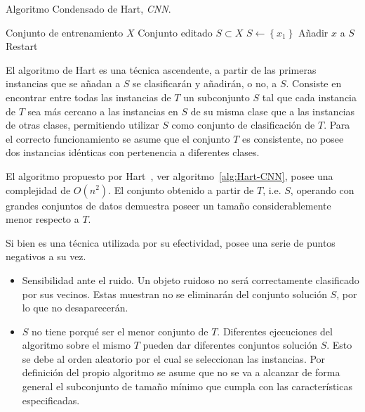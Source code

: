 \begin{algorithm}[H]
\caption{Algoritmo Condensado de Hart, \textit{CNN}.}\label{alg:Hart-CNN}
\begin{algorithmic}[1]
\Require Conjunto de entrenamiento $X$
\Ensure Conjunto editado $S \subset X$
\Statex
{}
	\State $S \leftarrow \left\lbrace x_1 \right\rbrace$
			\State Añadir $x$ a $S$
			\State Restart		
		\EndIf
	\EndFor
\EndProcedure
\end{algorithmic}
\end{algorithm}

El algoritmo de Hart es una técnica ascendente, a partir de las primeras instancias que se añadan a $S$ se clasificarán y añadirán, o no, a $S$. Consiste en encontrar entre todas las instancias de $T$ un subconjunto $S$ tal que cada instancia de $T$ sea más cercano a las instancias en $S$ de su misma clase que a las instancias de otras clases, permitiendo utilizar $S$ como conjunto de clasificación de $T$. Para el correcto funcionamiento se asume que el conjunto $T$ es consistente, no posee dos instancias idénticas con pertenencia a diferentes clases.

El algoritmo propuesto por Hart~\cite{hart1968condensed}, ver algoritmo~\ref{alg:Hart-CNN}, posee una complejidad de $O(n^2)$. El conjunto obtenido a partir de $T$, i.e. $S$, operando con grandes conjuntos de datos demuestra poseer un tamaño considerablemente menor respecto a $T$. 

Si bien es una técnica utilizada por su efectividad, posee una serie de puntos negativos a su vez.
\begin{itemize}
\item Sensibilidad ante el ruido. Un objeto ruidoso no será correctamente clasificado por sus vecinos. Estas muestran no se eliminarán del conjunto solución $S$, por lo que no desaparecerán.
\item $S$ no tiene porqué ser el menor conjunto de $T$. Diferentes ejecuciones del algoritmo sobre el mismo $T$ pueden dar diferentes conjuntos solución $S$. Esto se debe al orden aleatorio por el cual se seleccionan las instancias. Por definición del propio algoritmo se asume que no se va a alcanzar de forma general el subconjunto de tamaño mínimo que cumpla con las características especificadas.
\end{itemize}



